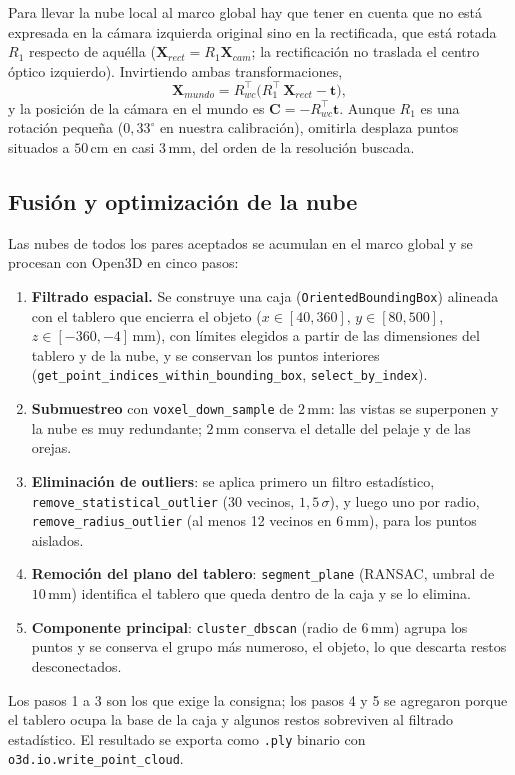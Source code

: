 \documentclass[10pt,a4paper,twocolumn]{article}
\newcommand{\mm}{\,\mathrm{mm}}
\newcommand{\T}{^{\top}}
\newcommand{\code}[1]{\texttt{#1}}
\begin{document}
Para llevar la nube local al marco global hay que tener en cuenta que no está expresada en la cámara izquierda original sino en la rectificada, que está rotada $R_1$ respecto de aquélla ($\mathbf{X}_{rect}=R_1\mathbf{X}_{cam}$; la rectificación no traslada el centro óptico izquierdo). Invirtiendo ambas transformaciones,
\begin{equation}
\mathbf{X}_{mundo}=R_{wc}\T\bigl(R_1\T\,\mathbf{X}_{rect}-\mathbf{t}\bigr),
\label{eq:global}
\end{equation}
y la posición de la cámara en el mundo es $\mathbf{C}=-R_{wc}\T\mathbf{t}$. Aunque $R_1$ es una rotación pequeña ($0{,}33^\circ$ en nuestra calibración), omitirla desplaza puntos situados a $50\,\mathrm{cm}$ en casi $3\mm$, del orden de la resolución buscada.

\subsection{Fusión y optimización de la nube}
\label{sec:met-fusion}

Las nubes de todos los pares aceptados se acumulan en el marco global y se procesan con Open3D \cite{open3d} en cinco pasos:
\begin{enumerate}\setlength{\itemsep}{0pt}\setlength{\parskip}{0pt}
\item {\raggedright \textbf{Filtrado espacial.} Se construye una caja (\code{OrientedBoundingBox}) alineada con el tablero que encierra el objeto ($x\in[40,360]$, $y\in[80,500]$, $z\in[-360,-4]\mm$), con límites elegidos a partir de las dimensiones del tablero y de la nube, y se conservan los puntos interiores (\code{get\_point\_indices\_within\_bounding\_box}, \code{select\_by\_index}).\par}   %
\item \textbf{Submuestreo} con \code{voxel\_down\_sample} de $2\mm$: las vistas se superponen y la nube es muy redundante; $2\mm$ conserva el detalle del pelaje y de las orejas.
\item \textbf{Eliminación de outliers}: se aplica primero un filtro estadístico, \code{remove\_statistical\_outlier} (30 vecinos, $1{,}5\,\sigma$), y luego uno por radio, \code{remove\_radius\_outlier} (al menos 12 vecinos en $6\mm$), para los puntos aislados.
\item \textbf{Remoción del plano del tablero}: \code{segment\_plane} (RANSAC, umbral de $10\mm$) identifica el tablero que queda dentro de la caja y se lo elimina.
\item \textbf{Componente principal}: \code{cluster\_dbscan} \cite{dbscan} (radio de $6\mm$) agrupa los puntos y se conserva el grupo más numeroso, el objeto, lo que descarta restos desconectados.
\end{enumerate}
Los pasos 1 a 3 son los que exige la consigna; los pasos 4 y 5 se agregaron porque el tablero ocupa la base de la caja y algunos restos sobreviven al filtrado estadístico. El resultado se exporta como \code{.ply} binario con \code{o3d.io.write\_point\_cloud}.
\end{document}
